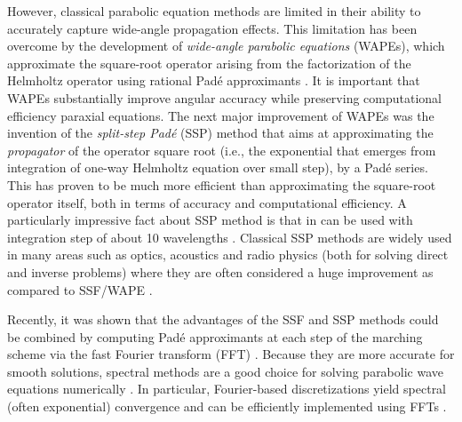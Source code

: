\documentclass[11pt,a4paper]{article}
\theoremstyle{plain}%
\theoremstyle{definition}
\theoremstyle{remark}
\begin{document}
However, classical parabolic equation methods are limited in their ability to accurately capture wide-angle propagation effects.
This limitation has been overcome by the development of \textit{wide-angle parabolic equations} (WAPEs), which approximate the square-root operator arising from the factorization of the Helmholtz operator using rational Pad\'e approximants \cite{abawi1997coupled, claerbout1976, collins93, jensen2011computational, levy2000parabolic, popov1977}. 
It is important that WAPEs substantially improve angular accuracy while preserving computational efficiency paraxial equations. 
The next major improvement of WAPEs was the invention of the \textit{split-step Pad\'e} (SSP) method \cite{avilov1995, collins93} that aims at approximating the \emph{propagator} of the operator square root (i.e., the exponential that emerges from integration of one-way Helmholtz equation over small step), by a Pad\'e series. 
This has proven to be much more efficient than approximating the square-root operator itself, both in terms of accuracy and computational efficiency. 
A particularly impressive fact about SSP method is that in can be used with integration step of about 10 wavelengths \cite{collins93, PETROV2020115526}.
Classical SSP methods are widely used in many areas such as optics, acoustics and radio physics (both for solving direct and inverse problems) where they are often considered a huge improvement as compared to SSF/WAPE \cite{Lu2003, lu2006some, collins2019parabolic, lin2013, lytaev2018nonlocal, lytaev2018splitirregular, petrov024generalization, wu2023higher, lytaev2026}.


Recently, it was shown that the advantages of the SSF and SSP methods could be combined by computing Pad\'e approximants at each step of the marching scheme via the fast Fourier transform (FFT) \cite{Daniel1}.
Because they are more accurate for smooth solutions, spectral methods are a good choice for solving parabolic wave equations numerically \cite{boyd2001chebyshev, feit1978light}.
In particular, Fourier-based discretizations yield spectral (often exponential) convergence and can be efficiently implemented using FFTs \cite{trefethen2000spectral}.

\end{document}
